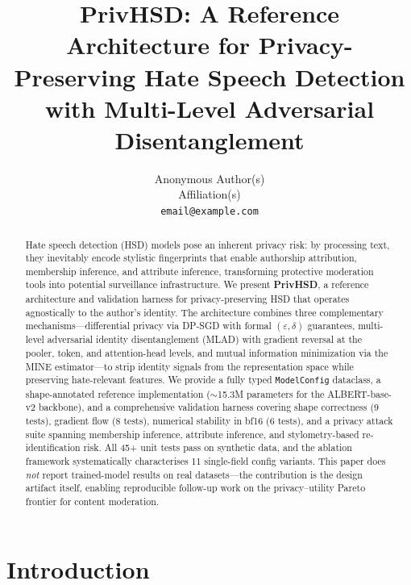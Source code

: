\documentclass{article}
\title{PrivHSD: A Reference Architecture for Privacy-Preserving Hate Speech Detection
       with Multi-Level Adversarial Disentanglement}
\author{Anonymous Author(s)\\
        Affiliation(s)\\
        \texttt{email@example.com}}
\begin{document}
\maketitle


\begin{abstract}
Hate speech detection (HSD) models pose an inherent privacy risk: by processing
text, they inevitably encode stylistic fingerprints that enable authorship
attribution, membership inference, and attribute inference, transforming
protective moderation tools into potential surveillance infrastructure.
We present \textbf{PrivHSD}, a reference architecture and validation harness for
privacy-preserving HSD that operates agnostically to the author's identity.
The architecture combines three complementary mechanisms---differential privacy
via DP-SGD with formal $(\varepsilon,\delta)$ guarantees, multi-level adversarial
identity disentanglement (MLAD) with gradient reversal at the pooler, token, and
attention-head levels, and mutual information minimization via the MINE
estimator---to strip identity signals from the representation space while
preserving hate-relevant features.
We provide a fully typed \texttt{ModelConfig} dataclass, a shape-annotated
reference implementation ($\sim$15.3M parameters for the ALBERT-base-v2
backbone), and a comprehensive validation harness covering shape correctness (9
tests), gradient flow (8 tests), numerical stability in bf16 (6 tests), and a
privacy attack suite spanning membership inference, attribute inference, and
stylometry-based re-identification risk.
All 45+ unit tests pass on synthetic data, and the ablation framework
systematically characterises 11 single-field config variants.
This paper does \emph{not} report trained-model results on real datasets---the
contribution is the design artifact itself, enabling reproducible follow-up
work on the privacy--utility Pareto frontier for content moderation.
\end{abstract}


\section{Introduction}
\end{document}
